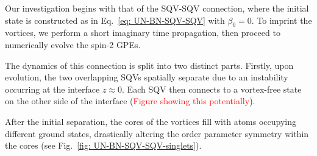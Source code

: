Our investigation begins with that of the SQV-SQV connection, where the initial
state is constructed as in Eq.~\eqref{eq: UN-BN-SQV-SQV} with \(\beta_0=0\).
To imprint the vortices, we perform a short imaginary time propagation, then
proceed to numerically evolve the spin-2 GPEs.

The dynamics of this connection is split into two distinct parts.
Firstly, upon evolution, the two overlapping SQVs spatially separate due to an
instability occurring at the interface \(z \approx 0\).
Each SQV then connects to a vortex-free state on the other side of the
interface (\textcolor{red}{Figure showing this potentially}).

After the initial separation, the cores of the vortices fill with atoms
occupying different ground states, drastically altering the order parameter
symmetry within the cores (see Fig.~\ref{fig: UN-BN-SQV-SQV-singlets}).
